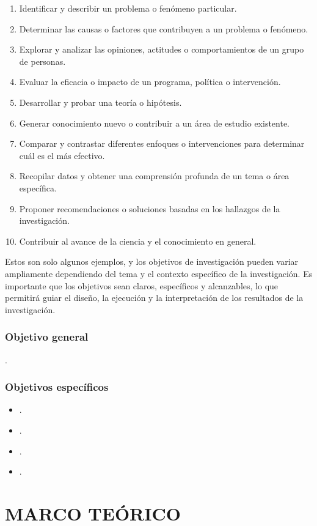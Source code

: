 \documentclass[12pt,a4paper]{article}
\begin{document}
\begin{enumerate}
	\item  Identificar y describir un problema o fenómeno particular.
	\item  Determinar las causas o factores que contribuyen a un problema o fenómeno.
	\item  Explorar y analizar las opiniones, actitudes o comportamientos de un grupo de personas.
	\item  Evaluar la eficacia o impacto de un programa, política o intervención.
	\item  Desarrollar y probar una teoría o hipótesis.
	\item  Generar conocimiento nuevo o contribuir a un área de estudio existente.
	\item  Comparar y contrastar diferentes enfoques o intervenciones para determinar cuál es el más efectivo.
	\item  Recopilar datos y obtener una comprensión profunda de un tema o área específica.
	\item  Proponer recomendaciones o soluciones basadas en los hallazgos de la investigación.
	\item  Contribuir al avance de la ciencia y el conocimiento en general.
\end{enumerate}

Estos son solo algunos ejemplos, y los objetivos de investigación pueden variar ampliamente dependiendo del tema y el contexto específico de la investigación. Es importante que los objetivos sean claros, específicos y alcanzables, lo que permitirá guiar el diseño, la ejecución y la interpretación de los resultados de la investigación.

\subsubsection{Objetivo general}
\objetivo.
\subsubsection{Objetivos específicos}
\begin{itemize}
	\item \objetivoe.
	\item \objetivoee.
	\item \objetivoeee.
	\item \objetivoeeee.
\end{itemize}


\section{MARCO TEÓRICO}
\end{document}
